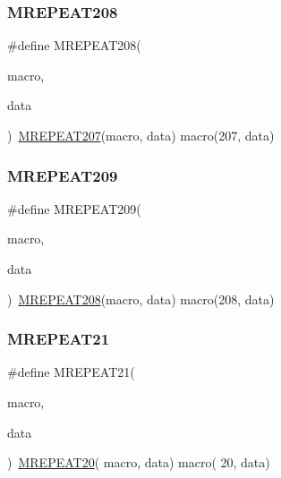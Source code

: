 \mbox{\label{group__group__sam0__utils__mrepeat_ga376e9d40a620958fa73305665ad13e5d}} 
\subsubsection{\texorpdfstring{MREPEAT208}{MREPEAT208}}
{\footnotesize\ttfamily \#define M\+R\+E\+P\+E\+A\+T208(\begin{DoxyParamCaption}\item[{}]{macro,  }\item[{}]{data }\end{DoxyParamCaption})~\mbox{\hyperlink{group__group__sam0__utils__mrepeat_ga3f4ed7437c340ec027580d80fdbfc353}{M\+R\+E\+P\+E\+A\+T207}}(macro, data)   macro(207, data)}

\mbox{\label{group__group__sam0__utils__mrepeat_ga6febba153ad3a3ea0ddd84b95ddded40}} 
\subsubsection{\texorpdfstring{MREPEAT209}{MREPEAT209}}
{\footnotesize\ttfamily \#define M\+R\+E\+P\+E\+A\+T209(\begin{DoxyParamCaption}\item[{}]{macro,  }\item[{}]{data }\end{DoxyParamCaption})~\mbox{\hyperlink{group__group__sam0__utils__mrepeat_ga376e9d40a620958fa73305665ad13e5d}{M\+R\+E\+P\+E\+A\+T208}}(macro, data)   macro(208, data)}

\mbox{\label{group__group__sam0__utils__mrepeat_ga7eaa38d60b2cfa155145e2d908577783}} 
\subsubsection{\texorpdfstring{MREPEAT21}{MREPEAT21}}
{\footnotesize\ttfamily \#define M\+R\+E\+P\+E\+A\+T21(\begin{DoxyParamCaption}\item[{}]{macro,  }\item[{}]{data }\end{DoxyParamCaption})~\mbox{\hyperlink{group__group__sam0__utils__mrepeat_ga938b8f75b8eedaadcfec2c375f7c7d2a}{M\+R\+E\+P\+E\+A\+T20}}( macro, data)   macro( 20, data)}

